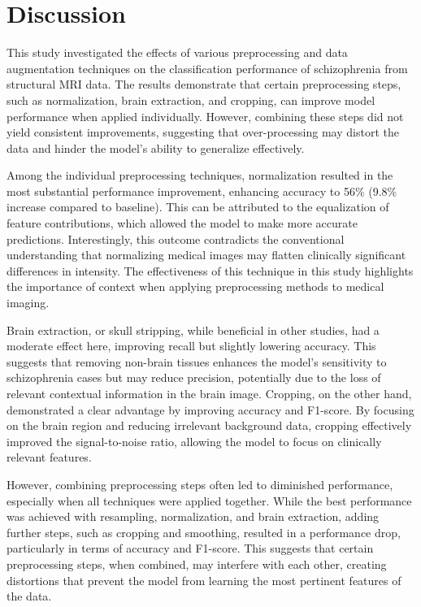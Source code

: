 \section{Discussion}

This study investigated the effects of various preprocessing and data augmentation techniques on the classification performance of schizophrenia from structural MRI data. The results demonstrate that certain preprocessing steps, such as normalization, brain extraction, and cropping, can improve model performance when applied individually. However, combining these steps did not yield consistent improvements, suggesting that over-processing may distort the data and hinder the model's ability to generalize effectively.

Among the individual preprocessing techniques, normalization resulted in the most substantial performance improvement, enhancing accuracy to 56\% (9.8\% increase compared to baseline). This can be attributed to the equalization of feature contributions, which allowed the model to make more accurate predictions. Interestingly, this outcome contradicts the conventional understanding that normalizing medical images may flatten clinically significant differences in intensity. The effectiveness of this technique in this study highlights the importance of context when applying preprocessing methods to medical imaging.

Brain extraction, or skull stripping, while beneficial in other studies, had a moderate effect here, improving recall but slightly lowering accuracy. This suggests that removing non-brain tissues enhances the model's sensitivity to schizophrenia cases but may reduce precision, potentially due to the loss of relevant contextual information in the brain image. Cropping, on the other hand, demonstrated a clear advantage by improving accuracy and F1-score. By focusing on the brain region and reducing irrelevant background data, cropping effectively improved the signal-to-noise ratio, allowing the model to focus on clinically relevant features.

However, combining preprocessing steps often led to diminished performance, especially when all techniques were applied together. While the best performance was achieved with resampling, normalization, and brain extraction, adding further steps, such as cropping and smoothing, resulted in a performance drop, particularly in terms of accuracy and F1-score. This suggests that certain preprocessing steps, when combined, may interfere with each other, creating distortions that prevent the model from learning the most pertinent features of the data.

